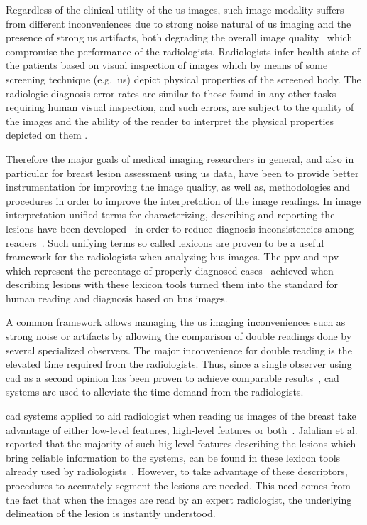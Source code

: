 \documentclass[authoryear,preprint,review,12pt]{elsarticle}
\begin{document}
Regardless of the clinical utility of the \ac{us} images, such image modality suffers from different inconveniences due to strong noise natural of \ac{us} imaging  and the presence of strong \ac{us} artifacts, both degrading the overall image quality~\cite{Ensminger:2008p6920} which compromise the performance of the radiologists. Radiologists infer health state of the patients based on visual inspection of images which by means of some screening technique (e.g.~\ac{us}) depict physical properties of the screened body. The radiologic diagnosis error rates are similar to those found in any other tasks requiring human visual inspection, and such errors, are subject to the quality of the images and the ability of the reader to interpret the physical properties depicted on them \cite{manning2005perception}.

Therefore the major goals of medical imaging researchers in general, and also in particular for breast lesion assessment using \ac{us} data, have been to provide better instrumentation for improving the image quality, as well as, methodologies and procedures in order to improve the interpretation of the image readings. In image interpretation unified terms for characterizing, describing and reporting the lesions have been developed~\cite{Stavros:1995p12392,mendelson2001toward,biradsus,stavros2004breast} in order to reduce diagnosis inconsistencies among readers~\cite{baker1999sonography}. Such unifying terms so called lexicons are proven to be a useful framework for the radiologists when analyzing \ac{bus} images. The \ac{ppv} and \ac{npv} which represent the percentage of properly diagnosed cases~\cite{altman1994statistics} achieved when describing lesions with these lexicon tools turned them into the standard for human reading and diagnosis based on \ac{bus} images. 

A common framework allows managing the \ac{us} imaging inconveniences such as strong noise or artifacts by allowing the comparison of double readings done by several specialized observers. The major inconvenience for double reading is the elevated time required from the radiologists. Thus, since a single observer using \ac{cad} as a second opinion has been proven to achieve comparable results~\cite{giger2008anniversary}, \ac{cad} systems are used to alleviate the time demand from the radiologists. 

\ac{cad} systems applied to aid radiologist when reading \ac{us} images of the breast take advantage of either low-level features, high-level features or both~\cite{Cheng:2009p10580}. Jalalian et al.~\cite{jalalian2012computer} reported that the majority of such hig-level features describing the lesions which bring reliable information to the systems, can be found in these lexicon tools already used by radiologists~\cite{biradsus,stavros2004breast}. However, to take advantage of these descriptors, procedures to accurately segment the lesions are needed. This need comes from the fact that when the images are read by an expert radiologist, the underlying delineation of the lesion is instantly understood.
\end{document}
